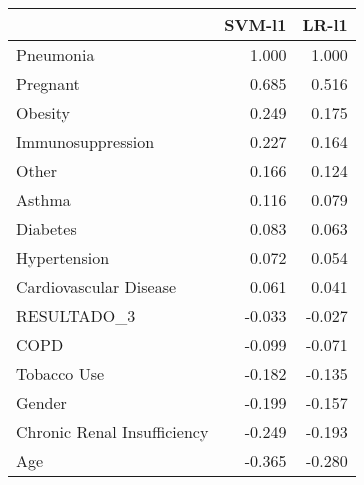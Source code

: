 \begin{tabular}{lrr}
\toprule
{} &  SVM-l1 &  LR-l1 \\
\midrule
Pneumonia                   &   1.000 &  1.000 \\
Pregnant                    &   0.685 &  0.516 \\
Obesity                     &   0.249 &  0.175 \\
Immunosuppression           &   0.227 &  0.164 \\
Other                       &   0.166 &  0.124 \\
Asthma                      &   0.116 &  0.079 \\
Diabetes                    &   0.083 &  0.063 \\
Hypertension                &   0.072 &  0.054 \\
Cardiovascular Disease      &   0.061 &  0.041 \\
RESULTADO\_3                 &  -0.033 & -0.027 \\
COPD                        &  -0.099 & -0.071 \\
Tobacco Use                 &  -0.182 & -0.135 \\
Gender                      &  -0.199 & -0.157 \\
Chronic Renal Insufficiency &  -0.249 & -0.193 \\
Age                         &  -0.365 & -0.280 \\
\bottomrule
\end{tabular}
